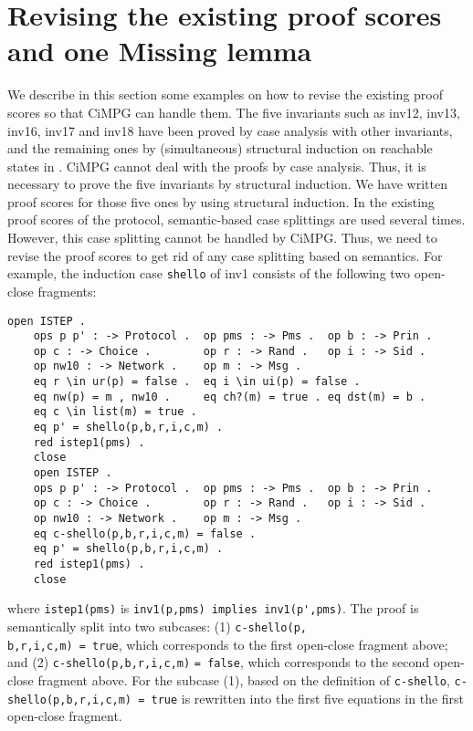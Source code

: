 \documentclass[a4paper,fleqn]{cas-dc}
\begin{document}
\section{Revising the existing proof scores and one Missing lemma}
\label{revision}
We describe in this section some examples on how to revise the existing proof scores so that CiMPG can handle them. The five invariants such as inv12, inv13, inv16, inv17 and inv18 have been proved by case analysis with other invariants, and the remaining ones by (simultaneous) structural induction on reachable states in \cite{1437139}. CiMPG cannot deal with the proofs by case analysis. Thus, it is necessary to prove the five invariants by structural induction. We have written proof scores for those five ones by using structural induction.
In the existing proof scores of the protocol, semantic-based case splittings are used several times. 
However, this case splitting cannot be handled by CiMPG. Thus, we need to revise the proof scores to get rid of any case splitting based on semantics. 
For example, the induction case \verb!shello! of inv1 consists of the following two open-close fragments:
\begin{verbatim}
open ISTEP .
	ops p p' : -> Protocol .  op pms : -> Pms .  op b : -> Prin .
	op c : -> Choice .        op r : -> Rand .   op i : -> Sid . 
	op nw10 : -> Network .    op m : -> Msg .           
	eq r \in ur(p) = false .  eq i \in ui(p) = false .
	eq nw(p) = m , nw10 .     eq ch?(m) = true . eq dst(m) = b .
	eq c \in list(m) = true . 
	eq p' = shello(p,b,r,i,c,m) .
	red istep1(pms) .
	close
	open ISTEP .
	ops p p' : -> Protocol .  op pms : -> Pms .  op b : -> Prin .
	op c : -> Choice .        op r : -> Rand .   op i : -> Sid . 
	op nw10 : -> Network .    op m : -> Msg .           
	eq c-shello(p,b,r,i,c,m) = false . 
	eq p' = shello(p,b,r,i,c,m) .
	red istep1(pms) .
	close
\end{verbatim}
\noindent
where \verb!istep1(pms)! is \verb!inv1(p,pms) implies inv1(p',pms)!.
The proof is semantically split into two subcases: (1)  \verb!c-shello(p,!\\\verb!b,r,i,c,m) = true!, which corresponds to the first open-close fragment above; 
and (2) \verb!c-shello(p,b,r,i,c,m)! \verb!= false!,
which corresponds to the second open-close fragment above. 
For the subcase (1), based on the definition of \verb!c-shello!,  \verb!c-shello(p,b,r,i,c,m) = true! is rewritten into the first five equations in the first open-close fragment. 
\end{document}
